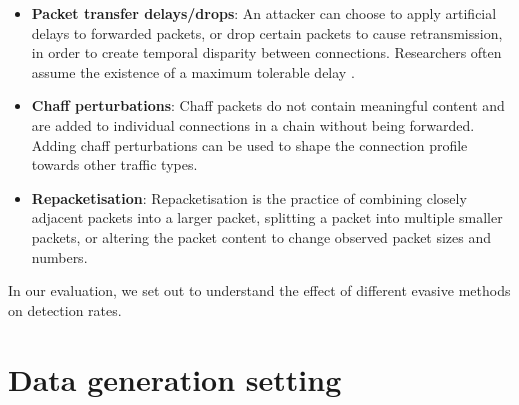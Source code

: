 



\begin{itemize}

\item \textbf{Packet transfer delays/drops}: An attacker can choose to apply artificial delays to forwarded packets, or drop certain packets to cause retransmission, in order to create temporal disparity between connections. Researchers often assume the existence of a maximum tolerable delay \cite{donoho2002multiscale}.

\item \textbf{Chaff perturbations}: Chaff packets do not contain meaningful content and are added to individual connections in a chain without being forwarded. Adding chaff perturbations can be used to shape the connection profile towards other traffic types. 

\item \textbf{Repacketisation}: Repacketisation is the practice of combining closely adjacent packets into a larger packet, splitting a packet into multiple smaller packets, or altering the packet content to change observed packet sizes and numbers.


\end{itemize}

In our evaluation, we set out to understand the effect of different evasive methods on detection rates. 

\section{Data generation setting}\label{SecN:Datasetcreation}


